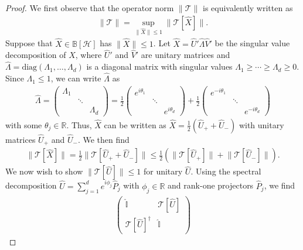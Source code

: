 \documentclass[preprint,pteplogo]{ptephy_v2}%
\numberwithin{equation}{section}
\theoremstyle{definition}
\newcommand{\mc}[1]{\mathcal{#1}}
\newcommand{\mbb}[1]{\mathbb{#1}}
\begin{document}
\begin{proof}
We first observe that the operator norm $\lVert \mc{T} \rVert$ is equivalently written as 
\begin{align}
\lVert \mc{T} \rVert = \sup_{\lVert \hat{X} \rVert \leq 1} \lVert \mc{T}[\hat{X}] \rVert.
\end{align}
Suppose that $\hat{X} \in \mbb{B}[\mc{H}]$ has $\lVert \hat{X} \rVert \leq 1$.
Let $\hat{X} = \hat{U}' \hat{\Lambda} \hat{V}'$ be the singular value decomposition of $\hat{X}$, where $\hat{U}'$ and $\hat{V}'$ are unitary matrices and $\hat{\Lambda} = \mathrm{diag}(\Lambda_1, \ldots, \Lambda_d)$ is a diagonal matrix with singular values $\Lambda_1 \geq \cdots \geq \Lambda_d \geq 0$.
Since $\Lambda_1 \leq 1$, we can write $\hat{\Lambda}$ as 
\begin{align}
\hat{\Lambda} 
= \begin{pmatrix} \Lambda_1 && \\ & \ddots & \\ && \Lambda_d \end{pmatrix}
= \frac{1}{2} \begin{pmatrix} e^{i\theta_1} && \\ & \ddots & \\ && e^{i\theta_d} \end{pmatrix} + \frac{1}{2} \begin{pmatrix} e^{-i\theta_1} && \\ & \ddots & \\ && e^{-i\theta_d} \end{pmatrix}
\end{align}
with some $\theta_j \in \mbb{R}$. 
Thus, $\hat{X}$ can be written as $\hat{X} = \frac{1}{2}(\hat{U}_+ + \hat{U}_-)$ with unitary matrices $\hat{U}_+$ and $\hat{U}_-$.
We then find
\begin{align}
\lVert \mc{T}[\hat{X}] \rVert 
= \frac{1}{2} \lVert \mc{T}[\hat{U}_+ + \hat{U}_-] \rVert 
\leq \frac{1}{2} \left( \lVert \mc{T}[\hat{U}_+] \rVert + \lVert \mc{T} [\hat{U}_-] \rVert \right).
\end{align}
We now wish to show $\lVert \mc{T}[\hat{U}] \rVert \leq 1$ for unitary $\hat{U}$.
Using the spectral decomposition $\hat{U} = \sum_{j=1}^d e^{i\phi_j} \hat{P}_j$ with $\phi_j \in \mbb{R}$ and rank-one projectors $\hat{P}_j$, we find
\begin{align}
\begin{pmatrix} \hat{\mbb{I}} & \mc{T}[\hat{U}] \\ \mc{T}[\hat{U}]^\dagger & \hat{\mbb{I}} \end{pmatrix}

\end{align}
\end{proof}
\end{document}
